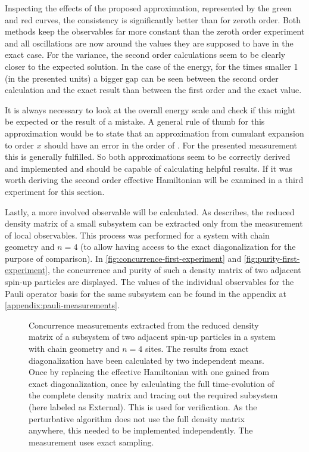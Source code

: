 Inspecting the effects of the proposed approximation, represented by the green and red curves, the consistency is significantly better than for zeroth order.
Both methods keep the observables far more constant than the zeroth order experiment and all oscillations are now around the values they are supposed to have in the exact case.
For the variance, the second order calculations seem to be clearly closer to the expected solution.
In the case of the energy, for the times smaller 1 (in the presented units) a bigger gap can be seen between the second order calculation and the exact result than between the first order and the exact value.

It is always necessary to look at the overall energy scale and check if this might be expected or the result of a mistake.
A general rule of thumb for this approximation would be to state that an approximation from cumulant expansion to order $x$ should have an error in the order of . 
For the presented measurement this is generally fulfilled. 
So both approximations seem to be correctly derived and implemented and should be capable of calculating helpful results.
If it was worth deriving the second order effective Hamiltonian will be examined in a third experiment for this section.

Lastly, a more involved observable will be calculated.
As  describes, the reduced density matrix of a small subsystem can be extracted only from the measurement of local observables.
This process was performed for a system with chain geometry and $n=4$ (to allow having access to the exact diagonalization for the purpose of comparison).
In \autoref{fig:concurrence-first-experiment} and \autoref{fig:purity-first-experiment}, the concurrence and purity of such a density matrix of two adjacent spin-up particles are displayed.
The values of the individual observables for the Pauli operator basis for the same subsystem can be found in the appendix at \ref{appendix:pauli-measurements}.


\begin{figure}[htbp]
    \centering
    \vspace{-0.3cm}
    \caption{
            Concurrence measurements extracted from the reduced density matrix of a subsystem of two adjacent spin-up particles in a system with chain geometry and $n=4$ sites.
            The results from exact diagonalization have been calculated by two independent means. 
            Once by replacing the effective Hamiltonian with one gained from exact diagonalization, once by calculating the full time-evolution of the complete density matrix and tracing out the required subsystem (here labeled as \glqq External\grqq).
            This is used for verification. 
            As the perturbative algorithm does not use the full density matrix anywhere, this needed to be implemented independently.
            The measurement uses exact sampling.
        }
    \label{fig:concurrence-first-experiment}
\end{figure}



